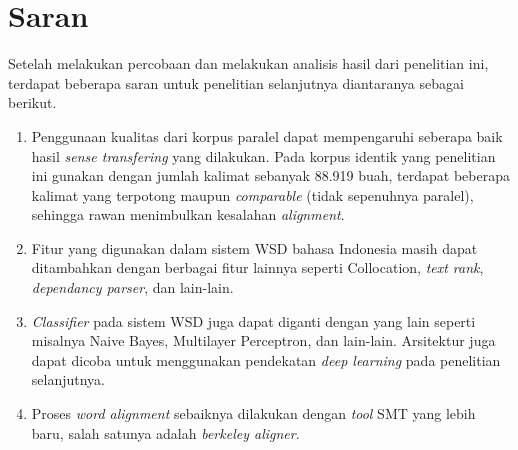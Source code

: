 \section{Saran}
Setelah melakukan percobaan dan melakukan analisis hasil dari penelitian ini, terdapat beberapa saran untuk penelitian selanjutnya diantaranya sebagai berikut.

\begin{enumerate}
	\item Penggunaan kualitas dari korpus paralel dapat mempengaruhi seberapa baik hasil \textit{sense transfering} yang dilakukan. Pada korpus identik yang penelitian ini gunakan dengan jumlah kalimat sebanyak 88.919 buah, terdapat beberapa kalimat yang terpotong maupun \textit{comparable} (tidak sepenuhnya paralel), sehingga rawan menimbulkan kesalahan \textit{alignment}.
	\item Fitur yang digunakan dalam sistem WSD bahasa Indonesia masih dapat ditambahkan dengan berbagai fitur lainnya seperti Collocation, \textit{text rank}, \textit{dependancy parser}, dan lain-lain.
	\item \textit{Classifier} pada sistem WSD juga dapat diganti dengan yang lain seperti misalnya Naive Bayes, Multilayer Perceptron, dan lain-lain. Arsitektur juga dapat dicoba untuk menggunakan pendekatan \textit{deep learning} pada penelitian selanjutnya.
	\item Proses \textit{word alignment} sebaiknya dilakukan dengan \textit{tool} SMT yang lebih baru, salah satunya adalah \textit{berkeley aligner}.
\end{enumerate}